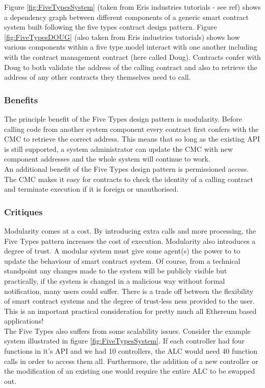 Figure \ref{fig:FiveTypesSystem} (taken from Eris industries tutorials - see ref) shows a dependency graph between different components of a generic smart contract system built following the five types contract design pattern. Figure \ref{fig:FiveTypesDOUG} (also taken from Eris industries tutorials) shows how various components within a five type model interact with one another including with the contract management contract (here called Doug). Contracts confer with Doug to both validate the address of the calling contract and also to retrieve the address of any other contracts they themselves need to call.

\subsubsection{Benefits}
The principle benefit of the Five Types design pattern is modularity. Before calling code from another system component every contract first confers with the CMC to retrieve the correct address. This means that so long as the existing API is still supported, a system administrator can update the CMC with new component addresses and the whole system will continue to work.\\

An additional benefit of the Five Types design pattern is permissioned access. The CMC makes it easy for contracts to check the identity of a calling contract and terminate execution if it is foreign or unauthorised. \\


\subsubsection{Critiques}
Modularity comes at a cost. By introducing extra calls and more processing, the Five Types pattern increases the cost of execution. Modularity also introduces a degree of trust. A modular system must give some agent(s) the power to to update the behaviour of smart contract system. Of course, from a technical standpoint any changes made to the system will be publicly visible but practically, if the system is changed in a malicious way without formal notification, many users could suffer. There is a trade off between the flexibility of smart contract systems and the degree of trust-less ness provided to the user. This is an important practical consideration for pretty much all Ethereum based applications! \\

The Five Types also suffers from some scalability issues. Consider the example system illustrated in figure \ref{fig:FiveTypesSystem}. If each controller had four functions in it's API and we had 10 controllers, the ALC would need 40 function calls in order to access them all. Furthermore, the addition of a new controller or the modification of an existing one would require the entire ALC to be swapped out. \\

